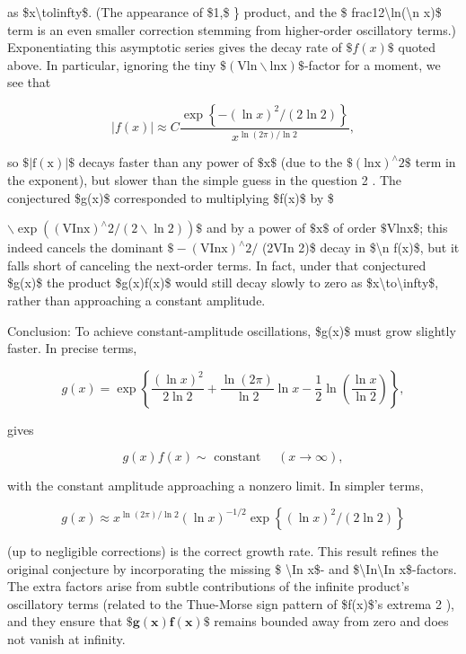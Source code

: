 \documentclass[10pt]{article}
\begin{document}
as \$x\textbackslash tolinfty\$. (The appearance of \$1,\$ \} product, and the \$ frac12\textbackslash ln(\textbackslash n x)\$ term is an even smaller correction stemming from higher-order oscillatory terms.) Exponentiating this asymptotic series gives the decay rate of $\$ f(x) \$$ quoted above. In particular, ignoring the tiny $\$(\mathrm{Vln} \backslash \mathrm{ln} \mathrm{x}) \$$-factor for a moment, we see that

$$
|f(x)| \approx C \frac{\exp \left\{-(\ln x)^{2} /(2 \ln 2)\right\}}{x^{\ln (2 \pi) / \ln 2}},
$$

so $\$|\mathrm{f}(\mathrm{x})| \$$ decays faster than any power of $\$ \mathrm{x} \$$ (due to the $\$(\mathrm{l} \mathrm{n} \mathrm{x})^{\wedge} 2 \$$ term in the exponent), but slower than the simple guess in the question 2 . The conjectured \$g(x)\$ corresponded to multiplying \$f(x)\$ by \$

$\backslash \exp \left((\mathrm{VIn} \mathrm{x})^{\wedge} 2 /(2 \backslash \ln 2)\right) \$$ and by a power of $\$ \mathrm{x} \$$ of order $\$ \mathrm{Vln} \mathrm{x} \$$; this indeed cancels the dominant $\$-(\mathrm{VIn} \mathrm{x})^{\wedge} 2 /$ (2VIn 2)\$ decay in \$\textbackslash n f(x)\$, but it falls short of canceling the next-order terms. In fact, under that conjectured \$g(x)\$ the product \$g(x)f(x)\$ would still decay slowly to zero as \$x\textbackslash to\textbackslash infty\$, rather than approaching a constant amplitude.

Conclusion: To achieve constant-amplitude oscillations, \$g(x)\$ must grow slightly faster. In precise terms,

$$
g(x)=\exp \left\{\frac{(\ln x)^{2}}{2 \ln 2}+\frac{\ln (2 \pi)}{\ln 2} \ln x-\frac{1}{2} \ln \left(\frac{\ln x}{\ln 2}\right)\right\},
$$

gives

$$
g(x) f(x) \sim \text { constant } \quad(x \rightarrow \infty),
$$

with the constant amplitude approaching a nonzero limit. In simpler terms,

$$
g(x) \approx x^{\ln (2 \pi) / \ln 2}(\ln x)^{-1 / 2} \exp \left\{(\ln x)^{2} /(2 \ln 2)\right\}
$$

(up to negligible corrections) is the correct growth rate. This result refines the original conjecture by incorporating the missing \$ \textbackslash In x\$- and \$\textbackslash In\textbackslash In x\$-factors. The extra factors arise from subtle contributions of the infinite product's oscillatory terms (related to the Thue-Morse sign pattern of \$f(x)\$'s extrema 2 ), and they ensure that $\mathbf{\$ g}(\mathbf{x}) \mathbf{f}(\mathbf{x}) \$$ remains bounded away from zero and does not vanish at infinity.
\end{document}
